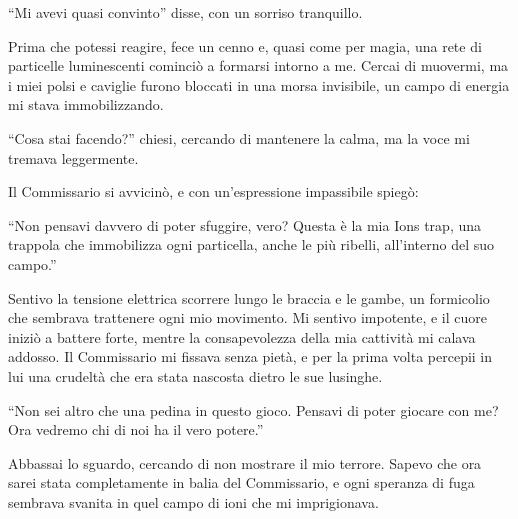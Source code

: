 \begin{dialogue}
 \enquote{Mi avevi quasi convinto} disse, con un sorriso tranquillo.
\end{dialogue}

Prima che potessi reagire, fece un cenno e, quasi come per magia, una rete di particelle luminescenti cominciò a formarsi intorno a me. Cercai di muovermi, ma i miei polsi e caviglie furono bloccati in una morsa invisibile, un campo di energia mi stava immobilizzando.

\begin{dialogue}
 \enquote{Cosa stai facendo?} chiesi, cercando di mantenere la calma, ma la voce mi tremava leggermente.
\end{dialogue}

Il Commissario si avvicinò, e con un'espressione impassibile spiegò:

\begin{dialogue}
 \enquote{Non pensavi davvero di poter sfuggire, vero? Questa è la mia Ions trap, una trappola  che immobilizza ogni particella, anche le più ribelli,  all'interno del suo campo.}
\end{dialogue}

Sentivo la tensione elettrica scorrere lungo le braccia e le gambe, un formicolio che sembrava trattenere ogni mio movimento. Mi sentivo impotente, e il cuore iniziò a battere forte, mentre la consapevolezza della mia cattività mi calava addosso. Il Commissario mi fissava senza pietà, e per la prima volta percepii in lui una crudeltà che era stata nascosta dietro le sue lusinghe.

\begin{dialogue}
 \enquote{Non sei altro che una pedina in questo gioco. Pensavi di poter giocare con me?  Ora vedremo chi di noi ha il vero potere.}
\end{dialogue}

Abbassai lo sguardo, cercando di non mostrare il mio terrore. Sapevo che ora sarei stata completamente in balia del Commissario, e ogni speranza di fuga sembrava svanita in quel campo di ioni che mi imprigionava.
